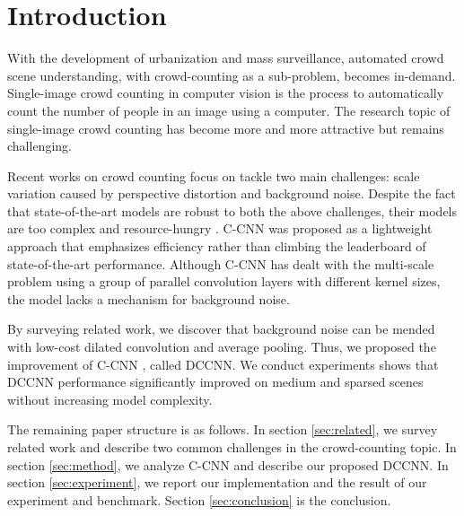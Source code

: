 \section{Introduction}







With the development of urbanization and mass surveillance, automated crowd scene understanding, with crowd-counting as a sub-problem, becomes in-demand. Single-image crowd counting in computer vision is the process to automatically count the number of people in an image using a computer. The research topic of single-image crowd counting has become more and more attractive but remains challenging.


Recent works on crowd counting focus on tackle two main challenges: scale variation caused by perspective distortion and background noise. Despite the fact that state-of-the-art models are robust to both the above challenges, their models are too complex and resource-hungry \cite{liu2019context, jiang2019crowd, liu2019adcrowdnet, amirgholipour2020pdanet}. C-CNN \cite{9053780} was proposed as a lightweight approach that emphasizes efficiency rather than climbing the leaderboard of state-of-the-art performance. Although C-CNN has dealt with the multi-scale problem using a group of parallel convolution layers with different kernel sizes, the model lacks a mechanism for background noise. 


By surveying related work, we discover that background noise can be mended with low-cost dilated convolution and average pooling. Thus, we proposed the improvement of C-CNN \cite{9053780}, called DCCNN. We conduct experiments shows that DCCNN performance significantly improved on medium and sparsed scenes without increasing model complexity.

The remaining paper structure is as follows. In section \ref{sec:related}, we survey related work and describe two common challenges in the crowd-counting topic. In section \ref{sec:method}, we analyze C-CNN and describe our proposed DCCNN. In section \ref{sec:experiment}, we report our implementation and the result of our experiment and benchmark. Section \ref{sec:conclusion} is the conclusion.
